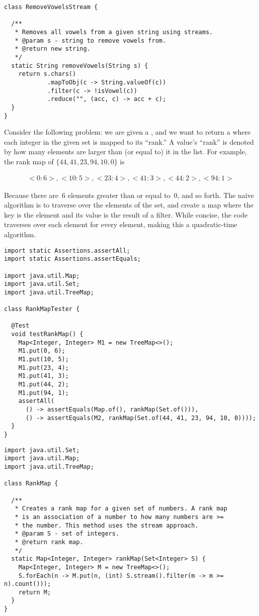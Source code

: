 \begin{lstlisting}[language=MyJava]
class RemoveVowelsStream {

  /**
   * Removes all vowels from a given string using streams.
   * @param s - string to remove vowels from.
   * @return new string.
   */
  static String removeVowels(String s) {
    return s.chars()
            .mapToObj(c -> String.valueOf(c))
            .filter(c -> !isVowel(c))
            .reduce("", (acc, c) -> acc + c);
  }
}
\end{lstlisting}

Consider the following problem: we are given a , and we want to return a  where each integer in the given set is mapped to its ``rank.'' 
A value's ``rank'' is denoted by how many elements are larger than (or equal to) it in the list.
For example, the rank map of $\{44, 41, 23, 94, 10, 0\}$ is

\begin{align*}
  {<0 : 6>, <10 : 5>, <23 : 4>, <41 : 3>, <44 : 2>, <94 : 1>}
\end{align*}

Because there are~$6$ elements greater than or equal to~$0$, and so forth.
The na\"ive algorithm is to traverse over the elements of the set, and create a map where the key is the element and its value is the result of a filter.
While concise, the code traverses over each element for every element, making this a quadratic-time algorithm.

\begin{lstlisting}[language=MyJava]
import static Assertions.assertAll;
import static Assertions.assertEquals;

import java.util.Map;
import java.util.Set;
import java.util.TreeMap;

class RankMapTester {

  @Test
  void testRankMap() {
    Map<Integer, Integer> M1 = new TreeMap<>();
    M1.put(0, 6);
    M1.put(10, 5);
    M1.put(23, 4);
    M1.put(41, 3);
    M1.put(44, 2);
    M1.put(94, 1);
    assertAll(
      () -> assertEquals(Map.of(), rankMap(Set.of())),
      () -> assertEquals(M2, rankMap(Set.of(44, 41, 23, 94, 10, 0))));
  }
}
\end{lstlisting}

\begin{lstlisting}[language=MyJava]
import java.util.Set;
import java.util.Map;
import java.util.TreeMap;

class RankMap {

  /**
   * Creates a rank map for a given set of numbers. A rank map
   * is an association of a number to how many numbers are >=
   * the number. This method uses the stream approach.
   * @param S - set of integers.
   * @return rank map.
   */
  static Map<Integer, Integer> rankMap(Set<Integer> S) {
    Map<Integer, Integer> M = new TreeMap<>();
    S.forEach(n -> M.put(n, (int) S.stream().filter(m -> m >= n).count()));
    return M;
  }
}
\end{lstlisting}


